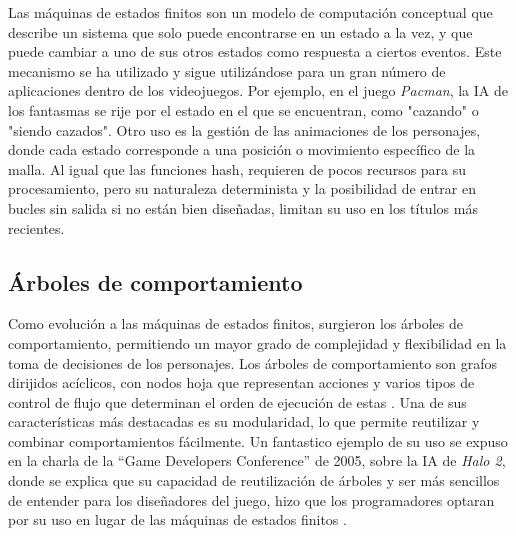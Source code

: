 Las máquinas de estados finitos son un modelo de computación conceptual que describe un sistema que solo puede encontrarse en un estado a la vez, y que puede cambiar a uno de sus otros estados como respuesta a ciertos eventos. Este mecanismo se ha utilizado y sigue utilizándose para un gran número de aplicaciones dentro de los videojuegos. Por ejemplo, en el juego \textit{Pac\-man}, la IA de los fantasmas se rije por el estado en el que se encuentran, como "cazando" o "siendo cazados". Otro uso es la gestión de las animaciones de los personajes, donde cada estado corresponde a una posición o movimiento específico de la malla. Al igual que las funciones hash, requieren de pocos recursos para su procesamiento, pero su naturaleza determinista y la posibilidad de entrar en bucles sin salida si no están bien diseñadas, limitan su uso en los títulos más recientes.

\subsection{Árboles de comportamiento}

Como evolución a las máquinas de estados finitos, surgieron los árboles de comportamiento, permitiendo un mayor grado de complejidad y flexibilidad en la toma de decisiones de los personajes. Los árboles de comportamiento son grafos dirijidos acíclicos, con nodos hoja que representan acciones y varios tipos de control de flujo que determinan el orden de ejecución de estas . Una de sus características más destacadas es su modularidad, lo que permite reutilizar y combinar comportamientos fácilmente. Un fantastico ejemplo de su uso se expuso en la charla de la ``Game Developers Conference'' de 2005, sobre la IA de \textit{Halo 2}, donde se explica que su capacidad de reutilización de árboles y ser más sencillos de entender para los diseñadores del juego, hizo que los programadores optaran por su uso en lugar de las máquinas de estados finitos .


